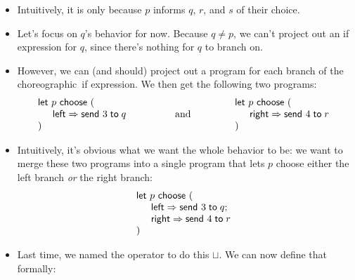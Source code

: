 \documentclass{lecturenotes}
\newcommand{\send}[2]{\ensuremath{\textsf{send}~#1 \mathrel{\textsf{to}} #2}}
\newcommand{\Left}{\textsf{left}\xspace}
\newcommand{\Right}{\textsf{right}\xspace}
\begin{document}
\begin{itemize}
\begin{itemize}
  \end{itemize}
\item Intuitively, it is only because $p$ informs $q$, $r$, and $s$ of their choice.
\item Let's focus on $q$'s behavior for now.
  Because $q \neq p$, we can't project out an \textsf{if} expression for $q$, since there's nothing for $q$ to branch on.
\item However, we can (and should) project out a program for each branch of the choreographic~\textsf{if} expression.
  We then get the following two programs:
  $$
  \begin{array}{l}
    \textsf{let}~p~\textsf{choose}~(\\
    \hspace{1em}\begin{array}[t]{l}
      \Left \Rightarrow\send{3}{q}
    \end{array}\\
    )
  \end{array}
  \hspace{4em} \text{and} \hspace{4em}
  \begin{array}{l}
    \textsf{let}~p~\textsf{choose}~(\\
    \hspace{1em}\begin{array}[t]{l}
      \Right \Rightarrow\send{4}{r}
    \end{array}\\
    )
  \end{array}
  $$
\item Intuitively, it's obvious what we want the whole behavior to be: we want to merge these two programs into a single program that lets $p$ choose either the \Left branch \emph{or} the \Right branch:
  $$
  \begin{array}{l}
    \textsf{let}~p~\textsf{choose}~(\\
    \hspace{1em}\begin{array}[t]{l}
      \Left \Rightarrow\send{3}{q};\\
      \Right \Rightarrow \send{4}{r}
    \end{array}\\
    )
  \end{array}
  $$
\item Last time, we named the operator to do this $\sqcup$.
  We can now define that formally:
\end{itemize}
\end{document}
